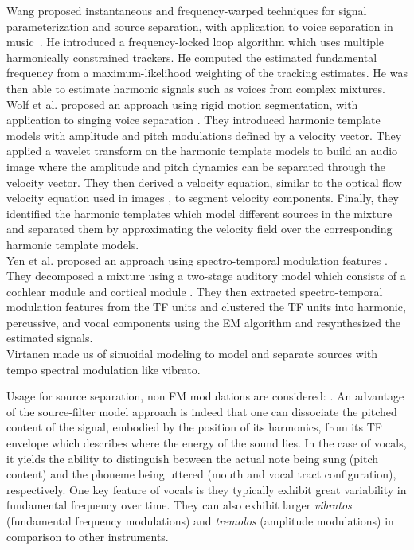 Wang proposed instantaneous and frequency-warped techniques for signal parameterization and source separation, with application to voice separation in music~\cite{wang94,wang95}.
He introduced a frequency-locked loop algorithm which uses multiple harmonically constrained trackers.
He computed the estimated fundamental frequency from a maximum-likelihood weighting of the tracking estimates. He was then able to estimate harmonic signals such as voices from complex mixtures.\\
Wolf et al. proposed an approach using rigid motion segmentation, with application to singing voice separation \cite{wolf14,wolf16}. They introduced harmonic template models with amplitude and pitch modulations defined by a velocity vector. They applied a wavelet transform \cite{anden14} on the harmonic template models to build an audio image where the amplitude and pitch dynamics can be separated through the velocity vector. They then derived a velocity equation, similar to the optical flow velocity equation used in images \cite{bernard01}, to segment velocity components. Finally, they identified the harmonic templates which model different sources in the mixture and separated them by approximating the velocity field over the corresponding harmonic template models.\\
Yen et al. proposed an approach using spectro-temporal modulation features \cite{yen14,yen15}. They decomposed a mixture using a two-stage auditory model which consists of a cochlear module \cite{chi05} and cortical module \cite{chi99}. They then extracted spectro-temporal modulation features from the TF units and clustered the TF units into harmonic, percussive, and vocal components using the EM algorithm and resynthesized the estimated signals.\\
Virtanen made us of sinuoidal modeling \cite{virtanen00} to model and separate sources with tempo spectral modulation like vibrato.

Usage for source separation, non FM modulations are considered: \cite{hennequin10}.
An advantage of the source-filter model approach is indeed that one can dissociate the pitched content of the signal, embodied by the position of its harmonics, from its TF envelope which describes where the energy of the sound lies. In the case of vocals, it yields the ability to distinguish between the actual note being sung (pitch content) and the phoneme being uttered (mouth and vocal tract configuration), respectively. One key feature of vocals is they typically exhibit great variability in fundamental frequency over time. They can also exhibit larger \textit{vibratos} (fundamental frequency modulations) and \textit{tremolos} (amplitude modulations) in comparison to other instruments.

